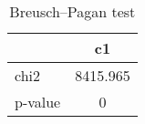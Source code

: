 \begin{table}[htbp]\centering
\caption{Breusch–Pagan test}
\begin{tabular}{l*{1}{c}}
\hline\hline
            &          c1\\
\hline
chi2        &    8415.965\\
p-value     &           0\\
\hline\hline
\end{tabular}
\end{table}
